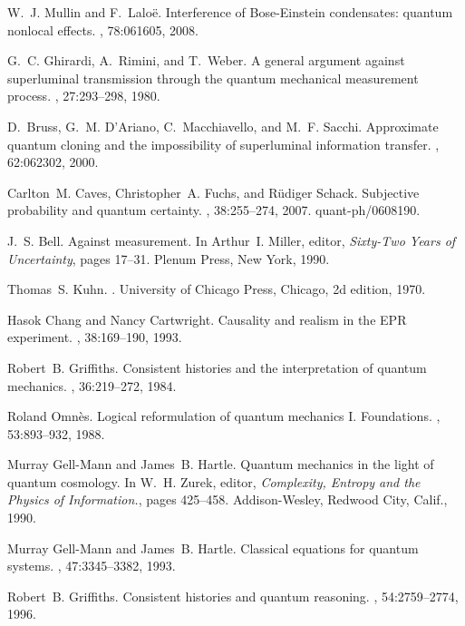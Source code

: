 \documentclass[10pt]{article} %
\begin{document}
\begin{thebibliography}{10}
W.~J. Mullin and F.~Lalo{\"e}.
\newblock Interference of {B}ose-{E}instein condensates: quantum nonlocal
  effects.
, 78:061605, 2008.

G.~C. Ghirardi, A.~Rimini, and T.~Weber.
\newblock A general argument against superluminal transmission through the
  quantum mechanical measurement process.
, 27:293--298, 1980.

D.~Bruss, G.~M. D'Ariano, C.~Macchiavello, and M.~F. Sacchi.
\newblock Approximate quantum cloning and the impossibility of superluminal
  information transfer.
, 62:062302, 2000.

Carlton~M. Caves, Christopher~A. Fuchs, and R{\"u}diger Schack.
\newblock Subjective probability and quantum certainty.
, 38:255--274, 2007.
\newblock quant-ph/0608190.

J.~S. Bell.
\newblock Against measurement.
\newblock In Arthur~I. Miller, editor, {\em Sixty-Two Years of Uncertainty},
  pages 17--31. Plenum Press, New York, 1990.

Thomas~S. Kuhn.
.
\newblock University of Chicago Press, Chicago, 2d edition, 1970.

Hasok Chang and Nancy Cartwright.
\newblock Causality and realism in the {E}{P}{R} experiment.
, 38:169--190, 1993.

Robert~B. Griffiths.
\newblock Consistent histories and the interpretation of quantum mechanics.
, 36:219--272, 1984.

Roland Omn\`es.
\newblock Logical reformulation of quantum mechanics {I}. {F}oundations.
, 53:893--932, 1988.

Murray Gell-Mann and James~B. Hartle.
\newblock Quantum mechanics in the light of quantum cosmology.
\newblock In W.~H. Zurek, editor, {\em Complexity, Entropy and the Physics of
  Information.}, pages 425--458. Addison-Wesley, Redwood City, Calif., 1990.

Murray Gell-Mann and James~B. Hartle.
\newblock Classical equations for quantum systems.
, 47:3345--3382, 1993.

Robert~B. Griffiths.
\newblock Consistent histories and quantum reasoning.
, 54:2759--2774, 1996.


\end{thebibliography}
\end{document}
